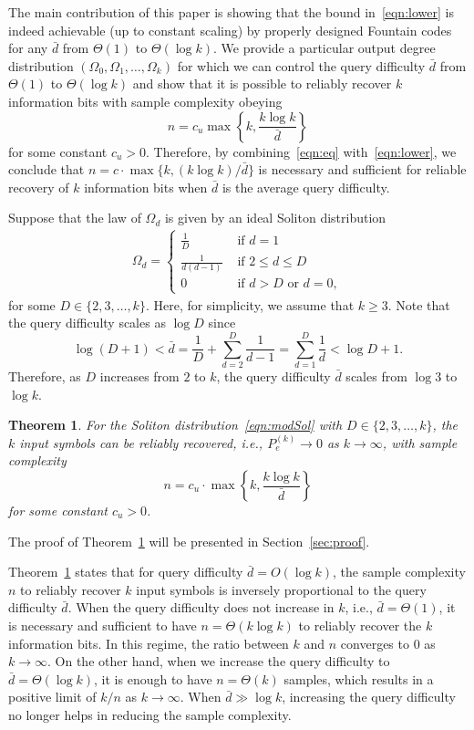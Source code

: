 \documentclass[11pt,onecolumn]{IEEEtran}
\newtheorem{thm}{Theorem}
\newcommand{\beq}{\begin{equation}}
\newcommand{\eeq}{\end{equation}}
\newcommand{\bard}{\bar{d}}
\begin{document}
The main contribution of this paper is showing that the bound in~\eqref{eqn:lower} is indeed achievable (up to constant scaling) by properly designed Fountain codes for any $\bar{d}$ from $\Theta(1)$ to $\Theta(\log k)$.
We provide a particular output degree distribution $(\Omega_0,\Omega_1,\dots, \Omega_k)$ for which we can control the query difficulty $\bar{d}$ from $\Theta(1)$ to $\Theta(\log k)$ and show that it is possible to reliably recover $k$ information bits with sample complexity obeying
\beq\label{eqn:eq}
n= c_u \max\left\{k,\frac{k\log k}{\bar{d}}\right\}
\eeq
for some constant $c_u>0$. Therefore, by combining~\eqref{eqn:eq} with~\eqref{eqn:lower}, we conclude that $n=c\cdot\max\{k,({k\log k})/{\bar{d}}\}$ is necessary and sufficient for reliable recovery of $k$ information bits when $\bar{d}$ is the average query difficulty. 

Suppose that the law of $\Omega_d$ is given by an ideal Soliton distribution
\beq\label{eqn:modSol}
\begin{aligned}
\Omega_d = 
	\begin{cases}
	\frac{1}{D} & \text{ if } d=1 \\
	\frac{1}{d(d-1)} & \text{ if } 2\leq d \leq D \\
	0 & \text{ if } d > D\text{ or }d=0,
	\end{cases}
\end{aligned}
\eeq
for some $D\in\{2,3,\dots,k\}$. Here, for simplicity, we assume that $k\geq 3$.
Note that the query difficulty scales as $\log D$ since
$$
\log (D+1) < \bar d = \frac{1}{D} + \sum_{d=2}^{D} \frac{1}{d-1} = \sum_{d=1}^D \frac{1}{d} < \log D + 1.
$$
Therefore, as $D$ increases from $2$ to $k$, the query difficulty $\bard$ scales from $\log 3$ to $\log k$.

\begin{thm}\label{thm:main}
{\it
For the Soliton distribution~\eqref{eqn:modSol} with $D\in\{2,3,\dots,k\}$, the $k$ input symbols can be reliably recovered, i.e., $P_e^{(k)}\to0$ as $k\to\infty$, with sample complexity
\beq\label{eqn:sam_up}
n=c_u \cdot \max\left\{k,\frac{k\log k}{\bar{d}}\right\}
\eeq
for some constant $c_u>0$. %
}
\end{thm}
The proof of Theorem~\ref{thm:main} will be presented in Section~\ref{sec:proof}.

Theorem~\ref{thm:main} states that for query difficulty $\bard = O(\log k)$, the sample complexity $n$ to reliably recover $k$ input symbols is inversely proportional to the query difficulty $\bard$. 
When the query difficulty does not increase in $k$, i.e., $\bard=\Theta(1)$, it is necessary and sufficient to have $n=\Theta(k\log k)$ to reliably recover the $k$ information bits.
In this regime, the ratio between $k$ and $n$ converges to 0 as $k\to\infty$.
On the other hand, when we increase the query difficulty to $\bard=\Theta(\log k)$, it is enough to have $n=\Theta(k)$ samples, which results in a positive limit of $k/n$ as $k\to\infty$.
When $\bard \gg \log k$, increasing the query difficulty no longer helps in reducing the sample complexity.
\end{document}
